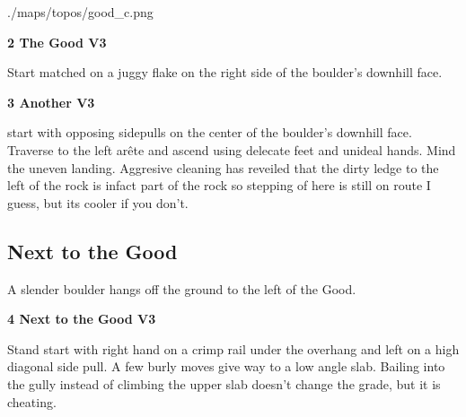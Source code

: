 	\begin{center}
	\begin{overpic}[width=0.9\linewidth]{./maps/topos/good_c.png}\label{tp:The Good}
	\end{overpic}
	\end{center}
	\raggedcolumns
	\begin{multicols}{2}


\needspace{1.5cm}
\label{rt:The Good}
\colorbox{green!20}{
\parbox{0.95\linewidth}{
\textbf{
2 The Good V3  
}}}
\begin{adjustwidth}{0.5cm}{}			
Start matched on a juggy flake on the right side of the boulder's downhill face.
\end{adjustwidth}




\needspace{1.5cm}
\label{rt:Another}
\colorbox{green!20}{
\parbox{0.95\linewidth}{
\textbf{
3 Another V3  \warn
}}}
\begin{adjustwidth}{0.5cm}{}			
start with opposing sidepulls on the center of the boulder's downhill face. Traverse to the left arête and ascend using delecate feet and unideal hands. Mind the uneven landing. Aggresive cleaning has reveiled that the dirty ledge to the left of the rock is infact part of the rock so stepping of here is still on route I guess, but its cooler if you don't.
\end{adjustwidth}





\needspace{1.5cm}
\subsection*{Next to the Good}\label{bf:Next to the Good}
A slender boulder hangs off the ground to the left of the Good.\\
	


\needspace{1.5cm}
\label{rt:Next to the Good}
\colorbox{green!20}{
\parbox{0.95\linewidth}{
\textbf{
4 Next to the Good V3  \warn
}}}
\begin{adjustwidth}{0.5cm}{}			
Stand start with right hand on a crimp rail under the overhang and left on a high diagonal side pull. A few burly moves give way to a low angle slab. Bailing into the gully instead of climbing the upper slab doesn't change the grade, but it is cheating.
\end{adjustwidth}





\end{multicols}
